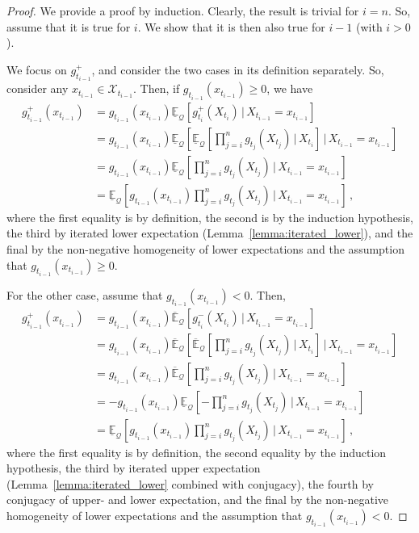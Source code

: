\documentclass[twoside,11pt]{article}
\newcommand{\states}{\mathcal{X}}
\newcommand{\rateset}{\mathcal{Q}}
\begin{document}
\begin{proof}
We provide a proof by induction. Clearly, the result is trivial for $i=n$. So, assume that it is true for $i$. We show that it is then also true for $i-1$ (with $i>0$).

We focus on $g_{t_{i-1}}^+$, and consider the two cases in its definition separately. So, consider any $x_{t_{i-1}}\in\states_{t_{i-1}}$. Then, if $g_{t_{i-1}}(x_{t_{i-1}})\geq 0$, we have
\begin{align*}
g_{t_{i-1}}^+(x_{t_{i-1}}) &= g_{t_{i-1}}(x_{t_{i-1}}) \underline{\mathbb{E}}_{\rateset}\left[g_{t_{i}}^+(X_{t_{i}})\,\vert\,X_{t_{i-1}}=x_{t_{i-1}}\right] \\
 &= g_{t_{i-1}}(x_{t_{i-1}})\underline{\mathbb{E}}_{\rateset}\left[\underline{\mathbb{E}}_{\rateset}\left[\prod_{j=i}^{n}g_{t_j}(X_{t_j})\,\Bigg\vert\,X_{t_i}\right]\,\Bigg\vert\,X_{t_{i-1}}=x_{t_{i-1}}\right] \\
 &= g_{t_{i-1}}(x_{t_{i-1}})\underline{\mathbb{E}}_{\rateset}\left[\prod_{j=i}^{n}g_{t_j}(X_{t_j})\,\Bigg\vert\,X_{t_{i-1}}=x_{t_{i-1}}\right] \\ 
 &= \underline{\mathbb{E}}_{\rateset}\left[g_{t_{i-1}}(x_{t_{i-1}})\prod_{j=i}^{n}g_{t_j}(X_{t_j})\,\Bigg\vert\,X_{t_{i-1}}=x_{t_{i-1}}\right]\,,
\end{align*}
where the first equality is by definition, the second is by the induction hypothesis, the third by iterated lower expectation (Lemma~\ref{lemma:iterated_lower}), and the final by the non-negative homogeneity of lower expectations and the assumption that $g_{t_{i-1}}(x_{t_{i-1}})\geq 0$.

For the other case, assume that $g_{t_{i-1}}(x_{t_{i-1}})< 0$. Then,
\begin{align*}
g_{t_{i-1}}^+(x_{t_{i-1}}) &= g_{t_{i-1}}(x_{t_{i-1}})\overline{\mathbb{E}}_{\rateset}\left[g_{t_{i}}^-(X_{t_{i}})\,\vert\,X_{t_{i-1}}=x_{t_{i-1}}\right] \\
&= g_{t_{i-1}}(x_{t_{i-1}})\overline{\mathbb{E}}_{\rateset}\left[ \overline{\mathbb{E}}_{\rateset}\left[\prod_{j=i}^{n}g_{t_j}(X_{t_j})\,\Bigg\vert\,X_{t_i}\right]\,\Bigg\vert\,X_{t_{i-1}}=x_{t_{i-1}}\right] \\
&= g_{t_{i-1}}(x_{t_{i-1}})\overline{\mathbb{E}}_{\rateset}\left[\prod_{j=i}^{n}g_{t_j}(X_{t_j})\,\Bigg\vert\,X_{t_{i-1}}=x_{t_{i-1}}\right] \\
&= -g_{t_{i-1}}(x_{t_{i-1}})\underline{\mathbb{E}}_{\rateset}\left[-\prod_{j=i}^{n}g_{t_j}(X_{t_j})\,\Bigg\vert\,X_{t_{i-1}}=x_{t_{i-1}}\right] \\
&= \underline{\mathbb{E}}_{\rateset}\left[g_{t_{i-1}}(x_{t_{i-1}})\prod_{j=i}^{n}g_{t_j}(X_{t_j})\,\Bigg\vert\,X_{t_{i-1}}=x_{t_{i-1}}\right]\,,
\end{align*}
where the first equality is by definition, the second equality by the induction hypothesis, the third by iterated upper expectation (Lemma~\ref{lemma:iterated_lower} combined with conjugacy), the fourth by conjugacy of upper- and lower expectation, and the final by the non-negative homogeneity of lower expectations and the assumption that $g_{t_{i-1}}(x_{t_{i-1}})<0$.


\end{proof}
\end{document}
